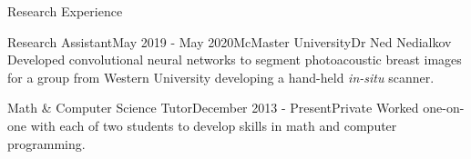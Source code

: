 \begin{rSection}{Research  Experience}
\begin{rSubsection}{Research Assistant}{May 2019 - May 2020}{McMaster University}{Dr Ned Nedialkov}
	Developed convolutional neural networks to segment photoacoustic breast images for a group from Western University developing a hand-held \textit{in-situ} scanner.
\end{rSubsection}


\begin{rSubsection}{Math \& Computer Science Tutor}{December 2013 - Present}{Private}{}
	Worked one-on-one with each of two students to develop skills in math and computer programming.
\end{rSubsection}

\end{rSection}